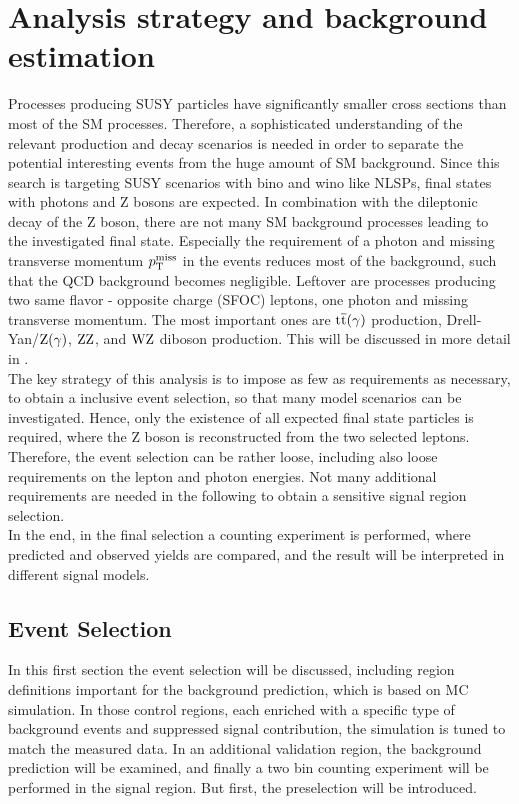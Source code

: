 \chapter{Analysis strategy and background estimation}\label{chap:analysis}

Processes producing SUSY particles have significantly smaller cross sections than most of the SM processes. Therefore, a sophisticated understanding of the relevant production and decay scenarios is needed in order to separate the potential interesting events from the huge amount of SM background. Since this search is targeting SUSY scenarios with bino and wino like NLSPs, final states with photons and Z bosons are expected. In combination with the dileptonic decay of the Z boson, there are not many SM background processes leading to the investigated final state. Especially the requirement of a photon and missing transverse momentum $p_{\mathrm{T}}^\text{miss}$ in the events reduces most of the background, such that \eg the QCD background becomes negligible. Leftover are processes producing two same flavor - opposite charge (SFOC) leptons, one photon and missing transverse momentum. The most important ones are ${\mathrm{t}\overline{\mathrm{t}}}(\gamma)$ production, Drell-Yan/$\mathrm{Z}(\gamma)$, $\mathrm{Z}\mathrm{Z}$, and $\mathrm{W}\mathrm{Z}$ diboson production. This will be discussed in more detail in .\\
The key strategy of this analysis is to impose as few as requirements as necessary, to obtain a inclusive event selection, so that many model scenarios can be investigated. Hence, only the existence of all expected final state particles is required, where the Z boson is reconstructed from the two selected leptons. Therefore, the event selection can be rather loose, including also loose requirements on the lepton and photon energies. Not many additional requirements are needed in the following to obtain a sensitive signal region selection.\\
In the end, in the final selection a counting experiment is performed, where predicted and observed yields are compared, and the result will be interpreted in different signal models.

\section{Event Selection}
In this first section the event selection will be discussed, including region definitions important for the background prediction, which is based on MC simulation. In those control regions, each enriched with a specific type of background events and suppressed signal contribution, the simulation is tuned to match the measured data. In an additional validation region, the background prediction will be examined, and finally a two bin counting experiment will be performed in the signal region. But first, the preselection will be introduced.
